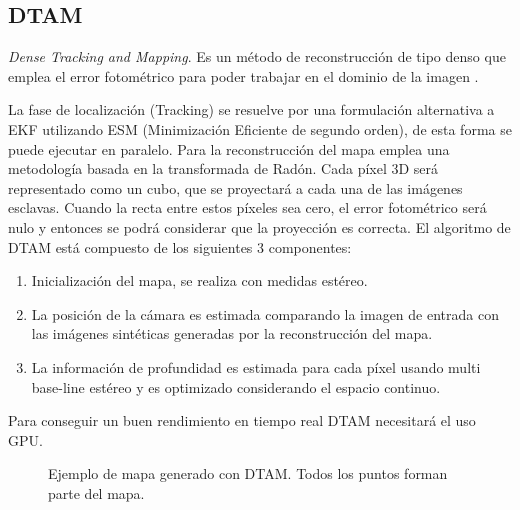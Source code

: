 \subsection{DTAM}
\textit {Dense Tracking and Mapping}. Es un método de reconstrucción de tipo denso que emplea el error fotométrico para poder trabajar en el dominio de la imagen 
\cite{Newcombe2011dtam}.

La fase de localización (Tracking) se resuelve por una formulación alternativa a EKF utilizando ESM (Minimización Eficiente de segundo orden), de esta forma se puede ejecutar en paralelo.
Para la reconstrucción del mapa emplea una metodología basada en la transformada de Radón. Cada píxel 3D será representado como un cubo, que se proyectará a cada una de las imágenes esclavas. Cuando la recta entre estos píxeles sea cero, el error fotométrico será nulo y entonces se podrá considerar que la proyección es correcta.
El algoritmo de DTAM está compuesto de los siguientes 3 componentes:
\begin{enumerate}
\item Inicialización del mapa, se realiza con medidas estéreo.

\item La posición de la cámara es estimada comparando la imagen de entrada con las imágenes sintéticas generadas por la reconstrucción del mapa.

\item La información de profundidad es estimada para cada píxel usando multi base-line estéreo y es optimizado considerando el espacio continuo.
\end{enumerate}

Para conseguir un buen rendimiento en tiempo real DTAM necesitará el uso GPU.




\begin{figure}[H]
\begin{center}
\end{center}
\caption{Ejemplo de mapa generado con DTAM. Todos los puntos forman parte del mapa.}
\end{figure}

